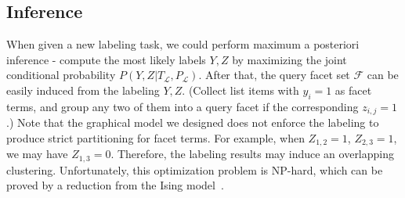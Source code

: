 \subsection{Inference}
\label{sec:facet-infer}
When given a new labeling task, we could perform maximum a posteriori inference -
compute the most likely labels $Y, Z$ by maximizing the joint conditional probability $P(Y,Z|T_{\mathcal{L}},P_{\mathcal{L}})$.
After that, the query facet set $\mathcal{F}$ can be easily induced from the labeling $Y, Z$.
(Collect list items with $y_i=1$ as facet terms, and group any two of them into a query facet if the corresponding $z_{i,j}=1$.)
Note that the graphical model we designed does not enforce the labeling to produce strict partitioning for facet terms.
For example, when $Z_{1,2}=1$, $Z_{2,3}=1$, we may have $Z_{1,3}=0$.
Therefore, the labeling results may induce an overlapping clustering.
Unfortunately, this optimization problem is NP-hard, which can be proved by a reduction from the Ising model~\cite{barahona1982computational}.

